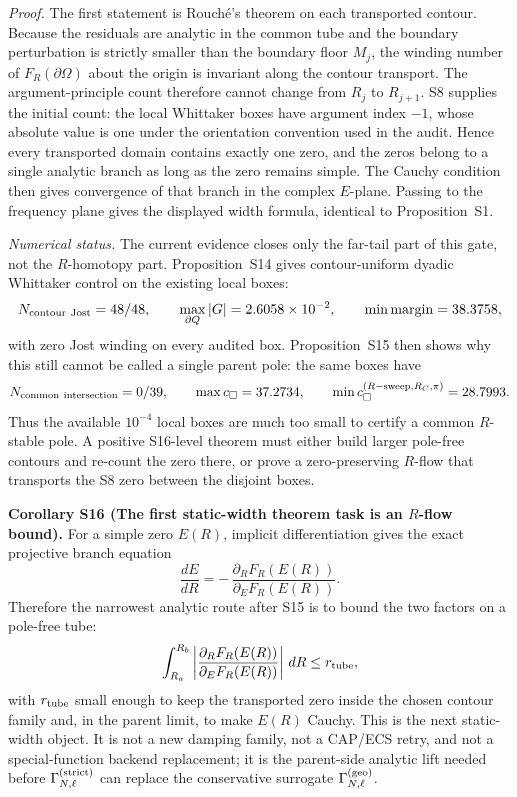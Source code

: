 \documentclass[aps,prd,onecolumn,notitlepage,nofootinbib,superscriptaddress,11pt,floatfix]{revtex4-2}
\begin{document}
\emph{Proof.}
The first statement is Rouché's theorem on each transported contour.  Because the residuals are analytic in the common tube and the boundary perturbation is strictly smaller than the boundary floor \(M_j\), the winding number of \(F_R(\partial\Omega)\) about the origin is invariant along the contour transport.  The argument-principle count therefore cannot change from \(R_j\) to \(R_{j+1}\).  S8 supplies the initial count: the local Whittaker boxes have argument index \(-1\), whose absolute value is one under the orientation convention used in the audit.  Hence every transported domain contains exactly one zero, and the zeros belong to a single analytic branch as long as the zero remains simple.  The Cauchy condition then gives convergence of that branch in the complex \(E\)-plane.  Passing to the frequency plane gives the displayed width formula, identical to Proposition~S1.

\emph{Numerical status.}
The current evidence closes only the far-tail part of this gate, not the \(R\)-homotopy part.  Proposition~S14 gives contour-uniform dyadic Whittaker control on the existing local boxes:
\[
N_{\rm contour\ Jost}=48/48,\qquad
\max_{\partial Q}|G|=2.6058\times10^{-2},
\qquad
\min {\rm margin}=38.3758,
\]
with zero Jost winding on every audited box.  Proposition~S15 then shows why this still cannot be called a single parent pole: the same boxes have
\[
N_{\rm common\ intersection}=0/39,
\qquad
\max c_\square=37.2734,
\qquad
\min c_\square^{(R{\rm -sweep},R_C,\pi)}=28.7993.
\]
Thus the available \(10^{-4}\) local boxes are much too small to certify a common \(R\)-stable pole.  A positive S16-level theorem must either build larger pole-free contours and re-count the zero there, or prove a zero-preserving \(R\)-flow that transports the S8 zero between the disjoint boxes.

\medskip\noindent\textbf{Corollary S16 (The first static-width theorem task is an \(R\)-flow bound).}
For a simple zero \(E(R)\), implicit differentiation gives the exact projective branch equation
\[
\frac{dE}{dR}
=
-\,\frac{\partial_R F_R(E(R))}{\partial_E F_R(E(R))}.
\]
Therefore the narrowest analytic route after S15 is to bound the two factors on a pole-free tube:
\[
\int_{R_a}^{R_b}
\left|
\frac{\partial_R F_R(E(R))}{\partial_E F_R(E(R))}
\right|\,dR
\le r_{\rm tube},
\]
with \(r_{\rm tube}\) small enough to keep the transported zero inside the chosen contour family and, in the parent limit, to make \(E(R)\) Cauchy.  This is the next static-width object.  It is not a new damping family, not a CAP/ECS retry, and not a special-function backend replacement; it is the parent-side analytic lift needed before \(\Gamma_{N,\ell}^{\rm(strict)}\) can replace the conservative surrogate \(\Gamma_{N,\ell}^{\rm(geo)}\).
\end{document}
